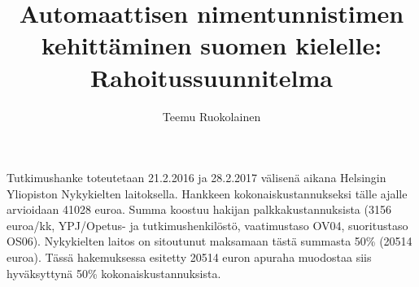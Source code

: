 \documentclass[12pt,a4paper,finnish,oneside]{article}
\begin{document}
\title{Automaattisen nimentunnistimen kehittäminen suomen kielelle: Rahoitussuunnitelma}
\author{Teemu Ruokolainen}


\maketitle

Tutkimushanke toteutetaan 21.2.2016 ja 28.2.2017 välisenä aikana Helsingin Yliopiston Nykykielten laitoksella. Hankkeen kokonaiskustannukseksi tälle ajalle arvioidaan 41028 euroa. Summa koostuu hakijan palkkakustannuksista (3156 euroa/kk, YPJ/Opetus- ja tutkimushenkilöstö, vaatimustaso OV04, suoritustaso OS06). Nykykielten laitos on sitoutunut maksamaan tästä summasta 50\% (20514 euroa). Tässä hakemuksessa esitetty 20514 euron apuraha muodostaa siis hyväksyttynä 50\% kokonaiskustannuksista.







\end{document}
